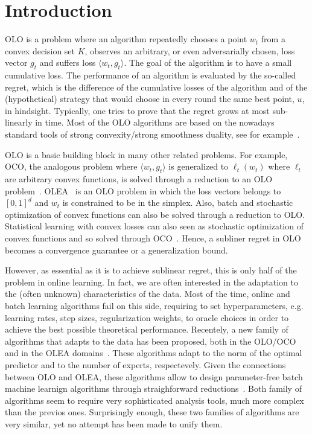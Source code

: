 \section{Introduction}
\label{section:introduction}



\ac{OLO} is a problem where an algorithm repeatedly chooses a point $w_t$ from a convex decision set $K$, observes an arbitrary, or even adversarially chosen, loss vector $g_t$ and suffers loss $\langle w_t, g_t \rangle$. The goal of the algorithm is to have a small cumulative loss. The performance of an algorithm is evaluated by the so-called regret, which is the difference of the cumulative losses of the algorithm and of the (hypothetical) strategy that would choose in every round the same best point, $u$, in hindsight.
Typically, one tries to prove that the regret grows at most sub-linearly in time.
Most of the \ac{OLO} algorithms are based on the nowadays standard tools of strong convexity/strong smoothness duality, see for example~\citet{OrabonaCCB15}.

\ac{OLO} is a basic building block in many other related problems. For example, \ac{OCO}, the analogous problem where $\langle w_t, g_t \rangle$ is generalized to $\ell_t(w_t)$ where $\ell_t$ are arbitrary convex functions, is solved through a reduction to an \ac{OLO} problem~\citep{Cesa-BianchiL06,Shalev-Shwartz12}. \ac{OLEA}~\citep{LittlestoneW94,Vovk98,Cesa-BianchiFHHSW97} is an \ac{OLO} problem in which the loss vectors belongs to $[0,1]^d$ and $w_t$ is constrained to be in the simplex. Also, batch and stochastic optimization of convex functions can also be solved through a reduction to \ac{OLO}. Statistical learning with convex losses can also seen as stochastic optimization of convex functions and so solved through \ac{OCO}~\citep{Munro1951}. Hence, a subliner regret in \ac{OLO} becomes a convergence guarantee or a generalization bound.

However, as essential as it is to achieve sublinear regret, this is only half of the problem in online learning. In fact, we are often interested in the adaptation to the (often unknown) characteristics of the data. Most of the time, online and batch learning algorithms fail on this side, requiring to set hyperparameters, e.g. learning rates, step sizes, regularization weights, to oracle choices in order to achieve the best possible theoretical performance.
Recentely, a new family of algorithms that adapts to the data has been proposed, both in the \ac{OLO}/\ac{OCO}~\citep{StreeterM12,Orabona13,McMahanA13,McMahanO14,Orabona14} and in the \ac{OLEA} domains~\citep{ChaudhuriYH09,ChernovV10,LuoE14,LuoS15,KoolenE15}. These algorithms adapt to the norm of the optimal predictor and to the number of experts, respectevely. Given the connections between \ac{OLO} and \ac{OLEA}, these algorithms allow to design parameter-free batch machine learnign algorithms through straighforward reductions~\citep{Orabona14,LuoS15}.
Both family of algorithms seem to require very sophisticated analysis tools, much more complex than the previos ones.
Surprisingly enough, these two families of algorithms are very similar, yet no attempt has been made to unify them.

